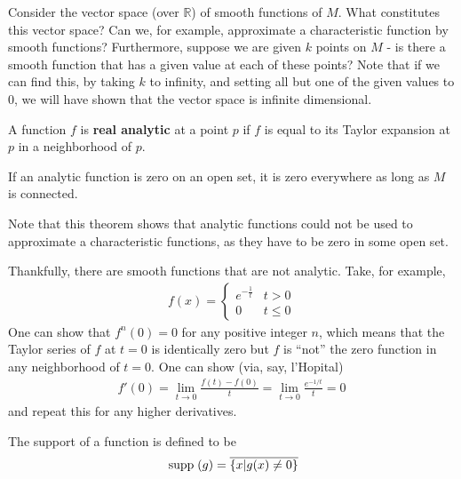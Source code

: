\documentclass{../mathnotes}
\begin{document}
Consider the vector space (over $\mathbb{R}$) of smooth functions of $M$. What constitutes this vector space? Can we, for example, approximate a characteristic
function by smooth functions? Furthermore, suppose we are given $k$ points on $M$ - is there a smooth function that has a given value at each of these points?
Note that if we can find this, by taking $k$ to infinity, and setting all but one of the given values to 0, we will have shown that the vector space is infinite
dimensional.

\begin{defn}
    A function $f$ is \textbf{real analytic} at a point $p$ if $f$ is equal to its Taylor expansion at $p$ in a neighborhood of $p$.
\end{defn}

\begin{thm}
    If an analytic function is zero on an open set, it is zero everywhere as long as $M$ is connected.
\end{thm}
Note that this theorem shows that analytic functions could not be used to approximate a characteristic functions, as they have to be zero in some open set.

Thankfully, there are smooth functions that are not analytic. Take, for example,
\begin{align*}
    f(x)=\left\{
        \begin{array}{lr}
            e^{-\frac{1}{t}} & t>0\\
            0 & t\leq 0
        \end{array}
    \right.
\end{align*}
One can show that $f^{n}(0)=0$ for any positive integer $n$, which means that the Taylor series of $f$ at $t=0$ is identically zero but $f$ is ``not''
the zero function in any neighborhood of $t=0$. One can show (via, say, l'Hopital)
\begin{align*}
    f'(0)=\lim_{t\to 0}\frac{f(t)-f(0)}{t}=\lim_{t\to 0}\frac{e^{-1/t}}{t}=0
\end{align*}
and repeat this for any higher derivatives.

\begin{lem}
\end{lem}

\begin{defn}
    The support of a function is defined to be
    \[\;\textnormal{supp}\;(g)=\overline{\left\{ x | g(x) \neq0 \right\}}\]
\end{defn}
\end{document}
